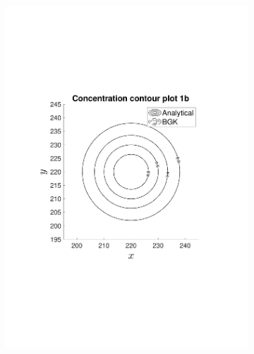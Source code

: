 \documentclass[11pt]{article}   	%
\begin{document}
\begin{figure}
\centering
\begin{subfigure}{0.5\textwidth}
  \centering
  \includegraphics[width=1.2\linewidth]{concentration_contour_benchmark_1b}
\end{subfigure}%
\begin{subfigure}{0.5\textwidth}
  \centering

\end{subfigure}
\end{figure}
\end{document}
